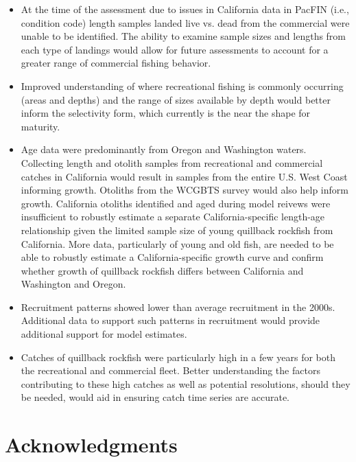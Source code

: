 \documentclass[11pt,
  english,
  letterpaper,
]{article}
\begin{document}
\begin{itemize}

  \item At the time of the assessment due to issues in California data in PacFIN (i.e., condition code) length samples landed live vs. dead from the commercial were unable to be identified. The ability to examine sample sizes and lengths from each type of landings would allow for future assessments to account for a greater range of commercial fishing behavior.
  
  \item Improved understanding of where recreational fishing is commonly occurring (areas and depths) and the range of sizes available by depth would better inform the selectivity form, which currently is the near the shape for maturity.  

    \item Age data were predominantly from Oregon and Washington waters. Collecting length and otolith samples from recreational and commercial catches in California would result in samples from the entire U.S. West Coast informing growth. Otoliths from the WCGBTS survey would also help inform growth. California otoliths identified and aged during model reivews were insufficient to robustly estimate a separate California-specific length-age relationship given the limited sample size of young quillback rockfish from California. More data, particularly of young and old fish, are needed to be able to robustly estimate a California-specific growth curve and confirm whether growth of quillback rockfish differs between California and Washington and Oregon. 
    
    \item Recruitment patterns showed lower than average recruitment in the 2000s. Additional data to support such patterns in recruitment would provide additional support for model estimates. 
    
    \item Catches of quillback rockfish were particularly high in a few years for both the recreational and commercial fleet. Better understanding the factors contributing to these high catches as well as potential resolutions, should they be needed, would aid in ensuring catch time series are accurate.  
    
\end{itemize}


\hypertarget{acknowledgments}{%
\section{Acknowledgments}\label{acknowledgments}}
\end{document}
